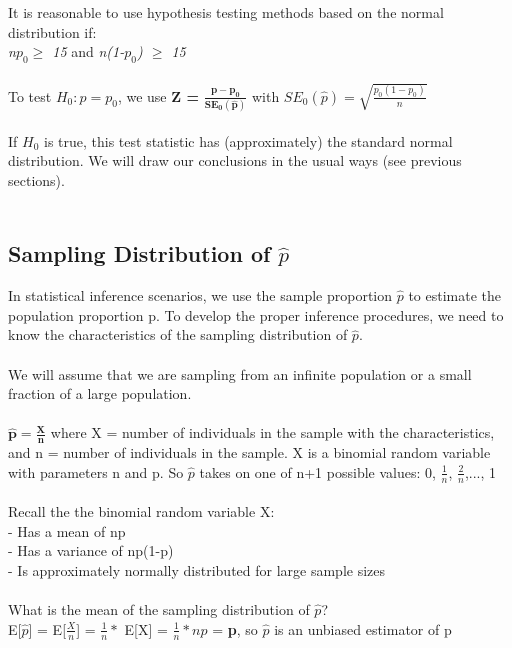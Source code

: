 \documentclass[12pt, a4paper]{article}
\begin{document}
	It is reasonable to use hypothesis testing methods based on the normal distribution if: \\
	\textit{n$p_0 \geq$ 15} and \textit{n(1-$p_0$) $\geq$ 15} \\~\\
	To test $H_0: p = p_0$, we use \textbf{Z =} $\bm{\frac{\hat{p} - p_0}{SE_0(\hat{p})}}$ with $SE_0(\hat{p}) = \sqrt{\frac{p_0(1-p_0)}{n}}$ \\~\\
	If $H_0$ is true, this test statistic has (approximately) the standard normal distribution. We will draw our conclusions in the usual ways (see previous sections). \\~\\
	
	\subsection{Sampling Distribution of $\hat{p}$}
	In statistical inference scenarios, we use the sample proportion $\hat{p}$ to estimate the population proportion p. To develop the proper inference procedures, we need to know the characteristics of the sampling distribution of $\hat{p}$. \\~\\
	We will assume that we are sampling from an infinite population or a small fraction of a large population. \\~\\
	$\bm{\hat{p} = \frac{X}{n}}$ where X = number of individuals in the sample with the characteristics, \\ \hspace*{13mm} and n = number of individuals in the sample. \newpage
	\noindent X is a binomial random variable with parameters n and p. So $\hat{p}$ takes on one of n+1 possible values: 0, $\frac{1}{n}$, $\frac{2}{n}$,..., 1 \\~\\
	Recall the the binomial random variable X: \\
	- Has a mean of np \\
	- Has a variance of np(1-p) \\
	- Is approximately normally distributed for large sample sizes \\~\\
	What is the mean of the sampling distribution of $\hat{p}$? \\
	E[$\hat{p}$] = E[$\frac{X}{n}$] = $\frac{1}{n} *$ E[X] = $\frac{1}{n} * np$ = \textbf{p}, so $\hat{p}$ is an unbiased estimator of p \\~\\
\end{document}
